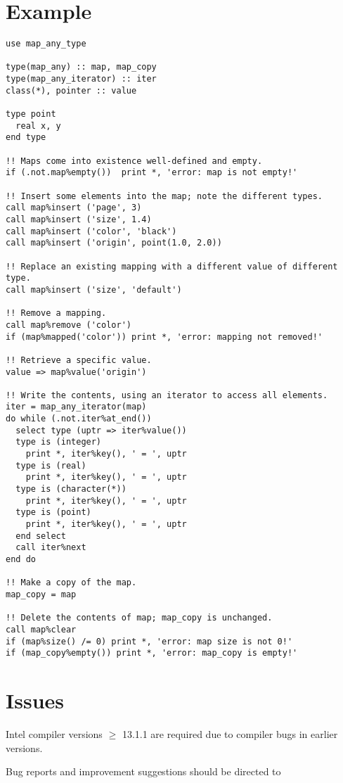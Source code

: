 \documentclass[11pt]{article}
\begin{document}
\section{Example}
\begin{verbatim}
use map_any_type

type(map_any) :: map, map_copy
type(map_any_iterator) :: iter
class(*), pointer :: value

type point
  real x, y
end type

!! Maps come into existence well-defined and empty.
if (.not.map%empty())  print *, 'error: map is not empty!'

!! Insert some elements into the map; note the different types.
call map%insert ('page', 3)
call map%insert ('size', 1.4)
call map%insert ('color', 'black')
call map%insert ('origin', point(1.0, 2.0))

!! Replace an existing mapping with a different value of different type.
call map%insert ('size', 'default')

!! Remove a mapping.
call map%remove ('color')
if (map%mapped('color')) print *, 'error: mapping not removed!'

!! Retrieve a specific value.
value => map%value('origin')

!! Write the contents, using an iterator to access all elements.
iter = map_any_iterator(map)
do while (.not.iter%at_end())
  select type (uptr => iter%value())
  type is (integer)
    print *, iter%key(), ' = ', uptr
  type is (real)
    print *, iter%key(), ' = ', uptr
  type is (character(*))
    print *, iter%key(), ' = ', uptr
  type is (point)
    print *, iter%key(), ' = ', uptr
  end select
  call iter%next
end do

!! Make a copy of the map.
map_copy = map

!! Delete the contents of map; map_copy is unchanged.
call map%clear
if (map%size() /= 0) print *, 'error: map size is not 0!'
if (map_copy%empty()) print *, 'error: map_copy is empty!'
\end{verbatim}

\section{Issues}
Intel compiler versions $\ge$ 13.1.1 are required due to compiler bugs
in earlier versions.

Bug reports and improvement suggestions should be directed to

\LatexManEnd
\end{document}
